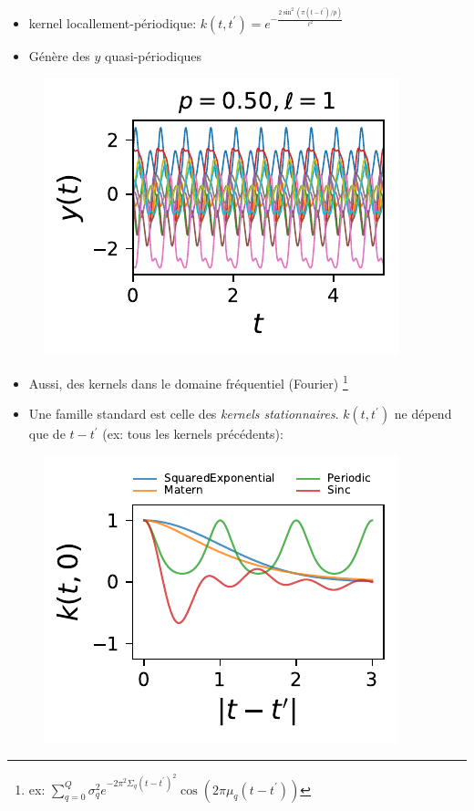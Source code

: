 \documentclass[xcolor=svgnames, t]{beamer}
\newcommand{\coloredemph}[1]{\textcolor{internationalblue}{\emph{#1}}}
\begin{document}
\begin{frame}{\subsecname}
  
  \begin{itemize}
    \item kernel locallement-périodique:
    $k (t, t^\prime) = e^{- \frac{2 \sin^2(\pi (t - t^\prime) / p)}{\ell^2}}$ %
    \item Génère des $y$ quasi-périodiques
  \end{itemize}
  \begin{figure}
    \includegraphics{10_gp_time_PeriodicKernel_0.50.pdf}
  \end{figure}
\end{frame}

% 
\begin{frame}{\subsecname}
  
  \begin{itemize}
    \item Aussi, des kernels dans le domaine fréquentiel (Fourier)
    \footnote{ex: $\sum_{q=0}^Q \sigma_q^2 e^{-2 \pi^2 \Sigma_q (t-t^\prime)^2} \cos(2\pi \mu_q (t-t^\prime))$}
  \pause
    \item Une famille standard est celle des \coloredemph{kernels stationnaires}. 
    $k(t, t^\prime)$ ne dépend que de $t - t^\prime$ (ex: tous les kernels précédents):
  \end{itemize}
  \begin{figure}
    \includegraphics[scale=0.80]{autocov_gp_1D.pdf}
  \end{figure}
\end{frame}
\end{document}
